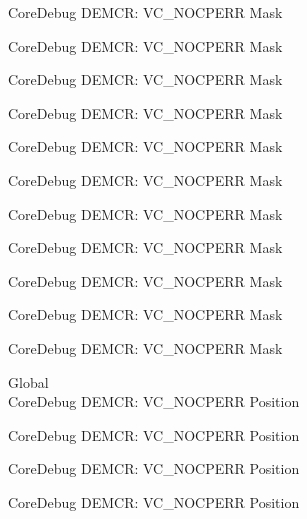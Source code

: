 \begin{DoxyRefList}
\label{deprecated__deprecated000210}%
%
Core\+Debug DEMCR\+: VC\+\_\+\+NOCPERR Mask 

\label{deprecated__deprecated000352}%
%
Core\+Debug DEMCR\+: VC\+\_\+\+NOCPERR Mask 

\label{deprecated__deprecated000428}%
%
Core\+Debug DEMCR\+: VC\+\_\+\+NOCPERR Mask 

\label{deprecated__deprecated000517}%
%
Core\+Debug DEMCR\+: VC\+\_\+\+NOCPERR Mask 

\label{deprecated__deprecated000619}%
%
Core\+Debug DEMCR\+: VC\+\_\+\+NOCPERR Mask 

\label{deprecated__deprecated000744}%
%
Core\+Debug DEMCR\+: VC\+\_\+\+NOCPERR Mask 

\label{deprecated__deprecated000888}%
%
Core\+Debug DEMCR\+: VC\+\_\+\+NOCPERR Mask 

\label{deprecated__deprecated001030}%
%
Core\+Debug DEMCR\+: VC\+\_\+\+NOCPERR Mask 

\label{deprecated__deprecated001106}%
%
Core\+Debug DEMCR\+: VC\+\_\+\+NOCPERR Mask 

\label{deprecated__deprecated001195}%
%
Core\+Debug DEMCR\+: VC\+\_\+\+NOCPERR Mask 

\label{deprecated__deprecated001297}%
%
Core\+Debug DEMCR\+: VC\+\_\+\+NOCPERR Mask  
\item[Global \doxylink{group___c_m_s_i_s___core_debug_gac9d13eb2add61f610d5ced1f7ad2adf8}{Core\+Debug\+\_\+\+DEMCR\+\_\+\+VC\+\_\+\+NOCPERR\+\_\+\+Pos} ]\hfill \\
\label{deprecated__deprecated000065}%
%
Core\+Debug DEMCR\+: VC\+\_\+\+NOCPERR Position 

\label{deprecated__deprecated000209}%
%
Core\+Debug DEMCR\+: VC\+\_\+\+NOCPERR Position 

\label{deprecated__deprecated000351}%
%
Core\+Debug DEMCR\+: VC\+\_\+\+NOCPERR Position 

\label{deprecated__deprecated000427}%
%
Core\+Debug DEMCR\+: VC\+\_\+\+NOCPERR Position 


\end{DoxyRefList}
